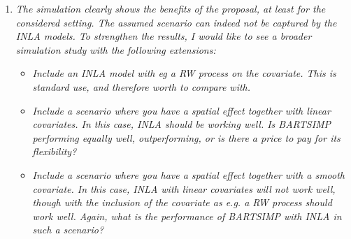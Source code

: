 \documentclass[12pt]{article}
\begin{document}
\begin{enumerate}
\begin{itemize}
    
    \item {\it Section 4.1--4.3 give all the details on the algorithm. While useful to have all the details, the mathematical details could go to an appendix, while the steps are briefly explained in the paper. With the focus on how the updates in BARTSIMP are different from BART.}\\

    {\color{darkblue} Thanks for the suggestion. We have now moved the details of the algorithm to the Supplementary Materials, Section 7. We have also added the following sentence at the start of Section 4: `` For the standard BART model, an efficient Gibbs-type sampler is available under conjugate priors on the model parameters \citep{chipman1998bayesian}. However, the computation faces scalability challenges once the spatial random effect component is added into the model.''}\\
    
\end{itemize}
\item {\it The simulation clearly shows the benefits of the proposal, at least for the considered setting. The assumed scenario can indeed not be captured by the INLA models. To strengthen the results, I would like to see a broader simulation study with the following extensions:}
\begin{itemize}
    \item {\it Include an INLA model with eg a RW process on the covariate. This is standard use, and therefore worth to compare with.}\\

        
    \item {\it Include a scenario where you have a spatial effect together with linear covariates. In this case, INLA should be working well. Is BARTSIMP performing equally well, outperforming, or is there a price to pay for its flexibility?}\\

       
    \item {\it Include a scenario where you have a spatial effect together with a smooth covariate. In this case, INLA with linear covariates will not work well, though with the inclusion of the covariate as e.g. a RW process should work well. Again, what is the performance of BARTSIMP with INLA in such a scenario?}\\



\end{itemize}
\end{enumerate}
\end{document}
